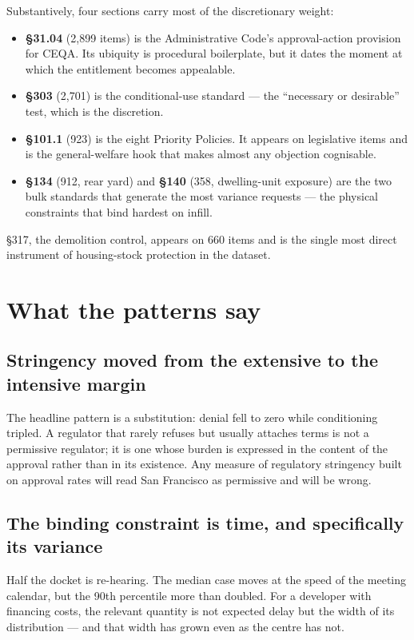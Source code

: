 \documentclass[11pt]{article}
\begin{document}
Substantively, four sections carry most of the discretionary weight:

\begin{itemize}
\item \textbf{\S31.04} (2{,}899 items) is the Administrative Code's approval-action provision
for CEQA. Its ubiquity is procedural boilerplate, but it dates the moment at which the
entitlement becomes appealable.
\item \textbf{\S303} (2{,}701) is the conditional-use standard --- the ``necessary or
desirable'' test, which is the discretion.
\item \textbf{\S101.1} (923) is the eight Priority Policies. It appears on legislative items
and is the general-welfare hook that makes almost any objection cognisable.
\item \textbf{\S134} (912, rear yard) and \textbf{\S140} (358, dwelling-unit exposure) are the
two bulk standards that generate the most variance requests --- the physical constraints that
bind hardest on infill.
\end{itemize}

\S317, the demolition control, appears on 660 items and is the single most direct instrument
of housing-stock protection in the dataset.

\section{What the patterns say}

\subsection{Stringency moved from the extensive to the intensive margin}

The headline pattern is a substitution: denial fell to zero while conditioning tripled. A
regulator that rarely refuses but usually attaches terms is not a permissive regulator; it is
one whose burden is expressed in the content of the approval rather than in its existence.
Any measure of regulatory stringency built on approval rates will read San Francisco as
permissive and will be wrong.

\subsection{The binding constraint is time, and specifically its variance}

Half the docket is re-hearing. The median case moves at the speed of the meeting calendar, but
the 90th percentile more than doubled. For a developer with financing costs, the relevant
quantity is not expected delay but the width of its distribution --- and that width has grown
even as the centre has not.
\end{document}
